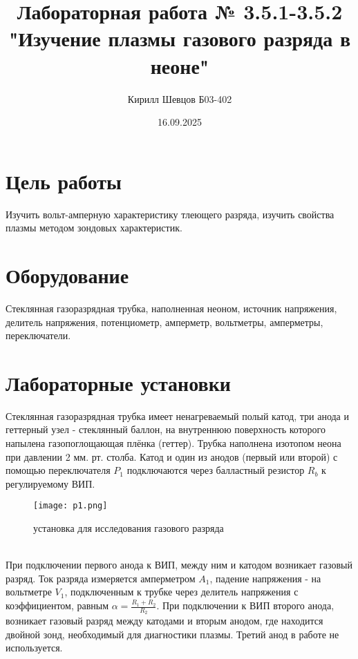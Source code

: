 \documentclass[a4paper, 12pt]{article}
\title{Лабораторная работа № 3.5.1-3.5.2 "Изучение плазмы газового разряда в неоне"}
\author{Кирилл Шевцов Б03-402}
\date{16.09.2025}
\begin{document}
\maketitle
\section*{Цель работы}
Изучить вольт-амперную характеристику тлеющего разряда, изучить свойства плазмы методом зондовых
характеристик.
\section*{Оборудование}
Стеклянная газоразрядная трубка, наполненная неоном, источник напряжения, делитель напряжения, потенциометр,
амперметр, вольтметры, амперметры, переключатели.
\section*{Лабораторные установки}
Стеклянная газоразрядная трубка имеет ненагреваемый полый катод, три анода и геттерный узел - стеклянный баллон,
на внутреннюю поверхность которого напылена газопоглощающая плёнка (геттер). Трубка наполнена изотопом неона при давлении
2 мм. рт. столба. Катод и один из анодов (первый или второй) с помощью переключателя $P_{1}$ подключаются через балластный резистор
$R_{b}$ к регулируемому ВИП.
\begin{figure}[htbp]
    \centering
    \texttt{[image: p1.png]}
    \caption{установка для исследования газового разряда}
    \label{установка для исследования газового разряда}
\end{figure}\\
При подключении первого анода к ВИП, между ним и катодом возникает газовый разряд. Ток разряда измеряется
амперметром $A_{1}$, падение напряжения - на вольтметре $V_{1}$, подключенным к трубке через делитель напряжения с
коэффициентом, равным $\alpha = \frac{R_{1} + R_{2}}{R_{2}}$. При подключении к ВИП второго анода, возникает газовый разряд между
катодами и вторым анодом, где находится двойной зонд, необходимый для диагностики плазмы. Третий анод в работе не используется.
\end{document}
